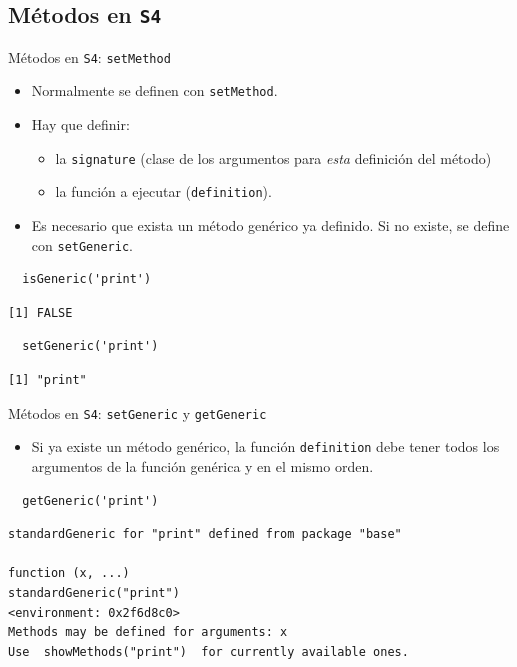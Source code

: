 \documentclass[xcolor={usenames,svgnames,dvipsnames}]{beamer}
\begin{document}
\subsection{Métodos en \texttt{S4}}
\label{sec:orgheadline36}

\begin{frame}[fragile,label={sec:orgheadline32}]{Métodos en \texttt{S4}: \texttt{setMethod}}
 \begin{itemize}
\item Normalmente se definen con \texttt{setMethod}.
\item Hay que definir:
\begin{itemize}
\item la \texttt{signature} (clase de los argumentos para \emph{esta} definición del
método)
\item la función a ejecutar (\texttt{definition}).
\end{itemize}
\item Es necesario que exista un método genérico ya definido. Si no
existe, se define con \texttt{setGeneric}.
\end{itemize}
\lstset{language=R,label= ,caption= ,captionpos=b,numbers=none}
\begin{lstlisting}
  isGeneric('print')
\end{lstlisting}

\begin{verbatim}
[1] FALSE
\end{verbatim}

\lstset{language=R,label= ,caption= ,captionpos=b,numbers=none}
\begin{lstlisting}
  setGeneric('print')
\end{lstlisting}

\begin{verbatim}
[1] "print"
\end{verbatim}
\end{frame}

\begin{frame}[fragile,label={sec:orgheadline33}]{Métodos en \texttt{S4}: \texttt{setGeneric} y \texttt{getGeneric}}
 \begin{itemize}
\item Si ya existe un método genérico, la función \texttt{definition} debe tener
todos los argumentos de la función genérica y en el mismo orden.
\end{itemize}
\lstset{language=R,label= ,caption= ,captionpos=b,numbers=none}
\begin{lstlisting}
  getGeneric('print')
\end{lstlisting}

\begin{verbatim}
standardGeneric for "print" defined from package "base"

function (x, ...) 
standardGeneric("print")
<environment: 0x2f6d8c0>
Methods may be defined for arguments: x
Use  showMethods("print")  for currently available ones.
\end{verbatim}
\end{frame}
\end{document}
